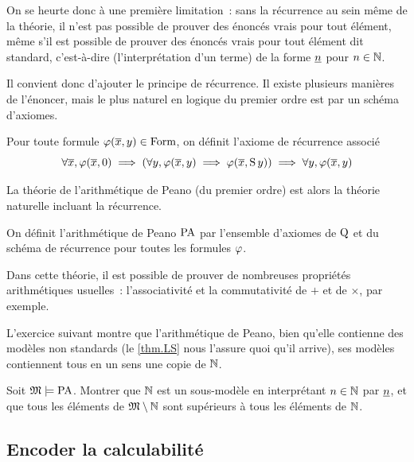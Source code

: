 On se heurte donc à une première limitation~: sans la récurrence au sein même de
la théorie, il n'est pas possible de prouver des énoncés vrais pour tout
élément, même s'il est possible de prouver des énoncés vrais pour tout élément
dit standard, c'est-à-dire (l'interprétation d'un terme) de la forme $\underline{n}$
pour $n \in \mathbb N$.

Il convient donc d'ajouter le principe de récurrence. Il existe plusieurs
manières de l'énoncer, mais le plus naturel en logique du premier ordre est par
un schéma d'axiomes.

\begin{axiom}\label{ax.rec}
  Pour toute formule $\varphi(\overline{x}, y)\in \operatorname{Form}$, on définit l'axiome de
  récurrence associé
  \[\forall \overline{x}, \varphi(\overline{x}, 0) \implies
  (\forall y, \varphi(\overline{x}, y) \implies \varphi(\overline{x}, \operatorname{S} y)) \implies
  \forall y, \varphi(\overline{x}, y)\]
\end{axiom}

La théorie de l'arithmétique de Peano (du premier ordre) est alors la théorie
naturelle incluant la récurrence.

\begin{definition}
  On définit l'arithmétique de Peano $\ArithPeano$ par l'ensemble d'axiomes de
  $\operatorname{Q}$ et du schéma de récurrence pour toutes les formules $\varphi$.
  \index[notation]{$\ArithPeano$}
\end{definition}

Dans cette théorie, il est possible de prouver de nombreuses propriétés
arithmétiques usuelles~: l'associativité et la commutativité de $+$ et de
$\times$, par exemple.

L'exercice suivant montre que l'arithmétique de Peano, bien qu'elle contienne
des modèles non standards (le \cref{thm.LS} nous l'assure quoi qu'il arrive),
ses modèles contiennent tous en un sens une copie de $\mathbb N$.

\begin{exercise}
  Soit $\mathfrak{M} \models \operatorname{PA}$. Montrer que $\mathbb N$ est un sous-modèle en
  interprétant $n \in \mathbb N$ par $\underline{n}$, et que tous les éléments de
  $\mathfrak{M} \setminus \mathbb N$ sont supérieurs à tous les éléments de $\mathbb N$.
\end{exercise}

\subsection{Encoder la calculabilité}

